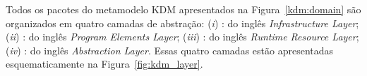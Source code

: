 Todos os pacotes do metamodelo KDM apresentados na Figura~\ref{kdm:domain} são organizados em quatro camadas de abstração: (\textit{i}) : do inglês \textit{Infrastructure Layer}; (\textit{ii}) : do inglês \textit{Program Elements Layer}; (\textit{iii}) : do inglês \textit{Runtime Resource Layer}; (\textit{iv}) : do inglês \textit{Abstraction Layer}. Essas quatro camadas estão apresentadas esquematicamente na Figura~\ref{fig:kdm_layer}.





